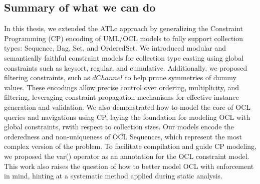 
\subsection*{Summary of what we can do}
In this thesis, we extended the ATLc approach by generalizing the Constraint Programming (CP) encoding of UML/OCL models to fully support collection types: Sequence, Bag, Set, and OrderedSet. We introduced modular and semantically faithful constraint models for collection type casting using global constraints such as keysort, regular, and cumulative. Additionally, we proposed filtering constraints, such as $dChannel$ to help prune symmetries of dummy values. These encodings allow precise control over ordering, multiplicity, and filtering, leveraging constraint propagation mechanisms for effective instance generation and validation.
We also demonstrated how to model the core of OCL queries and navigations using CP, laying the foundation for modeling OCL with global constraints, rwith respect to collection sizes. Our models encode the orderedness and non-uniqueness of OCL Sequences, which represent the most complex version of the problem. To facilitate compilation and guide CP modeling, we proposed the var() operator as an annotation for the OCL constraint model. This work also raises the question of how to better model OCL with enforcement in mind, hinting at a systematic method applied during static analysis.

